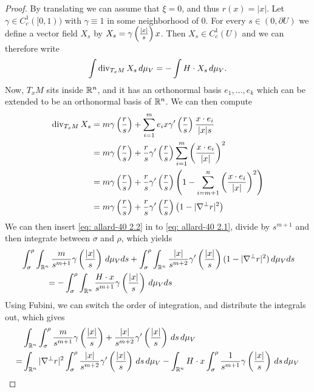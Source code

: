 \begin{proof}
By translating we can assume that $\xi = 0$, and thus $r(x)=|x|$. Let $\gamma \in C_c^1([0,1))$ with $\gamma \equiv 1$ in some neighborhood of 0. For every $s \in (0, \partial U)$ we define a vector field $X_s$ by $X_s = \gamma\left(\frac{|x|}{s}\right)x$. Then $X_s \in C_c^1(U)$ and we can therefore write
\begin{align}
    \int \operatorname{div}_{T_xM} X_s\, d\mu_V = - \int H \cdot X_s\, d\mu_V.\label{eq: allard-40 2.1}
\end{align}
Now, $T_xM$ sits inside $\mathbb{R}^n$, and it has an orthonormal basis $e_1, \dots, e_k$ which can be extended to be an orthonormal basis of $\mathbb{R}^n$. We can then compute
\begin{align}
    \operatorname{div}_{T_xM}X_s &= m\gamma\left(\frac{r}{s}\right) + \sum_{i=1}^m e_i x \gamma'\left(\frac{r}{s}\right) \frac{x\cdot e_i}{|x|s}\nonumber \\
    &= m\gamma\left(\frac{r}{s}\right) +  \frac{r}{s}\gamma'\left(\frac{r}{s}\right) \sum_{i=1}^m \left(\frac{x\cdot e_i}{|x|}\right)^2\nonumber \\
    &= m\gamma\left(\frac{r}{s}\right) +  \frac{r}{s}\gamma'\left(\frac{r}{s}\right) \left(1 -  \sum_{i=m+1}^n \left(\frac{x\cdot e_i}{|x|}\right)^2 \right)\nonumber \\
    &= m\gamma\left(\frac{r}{s}\right) +  \frac{r}{s}\gamma'\left(\frac{r}{s}\right) \left(1 -  |\nabla^{\perp}r|^2 \right) \label{eq: allard-40 2.2}
\end{align}
We can then insert \eqref{eq: allard-40 2.2} in to \eqref{eq: allard-40 2.1}, divide by $s^{m+1}$ and then integrate between $\sigma$ and $\rho$, which yields
\begin{align*}
    &\int_{\sigma}^{\rho}\int_{\mathbb{R}^n} \frac{m}{s^{m+1}}\gamma\left(\frac{|x|}{s}\right) \, d\mu_V ds + \int_{\sigma}^{\rho}\int_{\mathbb{R}^n} \frac{|x|}{s^{m+2}} \gamma'\left(\frac{|x|}{s}\right) (1 - |\nabla^{\perp}r|^2) \, d\mu_V ds \\
    & \qquad \quad = -\int_{\sigma}^{\rho}\int_{\mathbb{R}^n} \frac{H \cdot x}{s^{m+1}} \gamma\left(\frac{|x|}{s}\right)\, d\mu_V ds
\end{align*}
Using Fubini, we can switch the order of integration, and distribute the integrals out, which gives
\begin{align}
    &\int_{\R^n} \int_{\sigma}^{\rho} \frac{m}{s^{m+1}}\gamma\paren{\frac{|x|}{s}} + \frac{|x|}{s^{m+2}} \gamma'\paren{\frac{|x|}{s}} \, ds\, d\mu_V \nonumber\\
    =& \int_{\R^n} |\nabla^{\perp}r|^2 \int_{\sigma}^{\rho} \frac{|x|}{s^{m+2}} \gamma'\paren{\frac{|x|}{s}}\, ds\, d\mu_V - \int_{\R^n} H\cdot x \int_{\sigma}^{\rho} \frac{1}{s^{m+1}}\gamma\paren{\frac{|x|}{s}}\, ds\, d\mu_V \label{eq: allard-40 2.4}

\end{align}
\end{proof}
